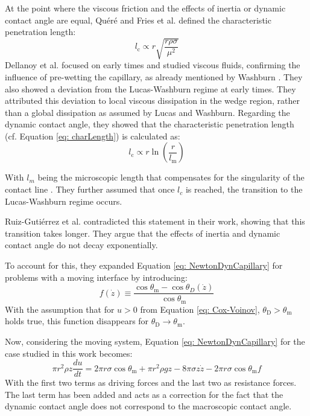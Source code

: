 At the point where the viscous friction and the effects of inertia or dynamic contact angle are equal, Quéré \cite{quere1997InertialCapillarity} and Fries et al. \cite{fries2008TransitionInertialViscous} defined the characteristic penetration length:
\begin{equation}
    \label{eq: charLength}
    l_{\mathrm{c}} \propto r \sqrt{\frac{r\rho \sigma}{\mu^2}}
\end{equation}
Dellanoy et al. \cite{delannoy2019DualRoleViscosity} focused on early times and studied viscous fluids, confirming the influence of pre-wetting the capillary, as already mentioned by Washburn \cite{washburn1921DynamicsCapillaryFlow}. They also showed a deviation from the Lucas-Washburn regime at early times. They attributed this deviation to local viscous dissipation in the wedge region, rather than a global dissipation as assumed by Lucas and Washburn. Regarding the dynamic contact angle, they showed that the characteristic penetration length (cf. Equation \ref{eq: charLength}) is calculated as:
\begin{equation}
    l_{\mathrm{c}} \propto r \ln\left(\frac{r}{l_{\mathrm{m}}}\right)
\end{equation}

With $l_m$ being the microscopic length that compensates for the singularity of the contact line \cite{cox1986DynamicsSpreadingLiquids}. They further assumed that once $l_c$ is reached, the transition to the Lucas-Washburn regime occurs.

Ruiz-Gutiérrez et al. \cite{ruiz-gutierrez2022LongCrossoverDynamics} contradicted this statement in their work, showing that this transition takes longer. They argue that the effects of inertia and dynamic contact angle do not decay exponentially. 

To account for this, they expanded Equation \ref{eq: NewtonDynCapillary} for problems with a moving interface by introducing:
\begin{equation}
    f(\dot{z}) \equiv \frac{\cos\theta_{\mathrm{m}}-\cos\theta_D(\dot{z})}{\cos\theta_{\mathrm{m}}} 
\end{equation}
With the assumption that for $u>0$ from Equation \ref{eq: Cox-Voinov}, $\theta_{\mathrm{D}} > \theta_{\mathrm{m}}$ holds true, this function disappears for $\theta_{\mathrm{D}} \rightarrow \theta_{\mathrm{m}}$. 

Now, considering the moving system, Equation \ref{eq: NewtonDynCapillary} for the case studied in this work becomes:
\begin{equation}
    \pi r^{2}\rho z \frac{du}{dt}= 2\pi r\sigma \cos\theta_{\mathrm{m}}+\pi r^{2}\rho gz-8\pi \sigma z \dot{z} -2\pi r \sigma \cos \theta_{\mathrm{m}}f
\end{equation}
With the first two terms as driving forces and the last two as resistance forces. The last term has been added and acts as a correction for the fact that the dynamic contact angle does not correspond to the macroscopic contact angle.

